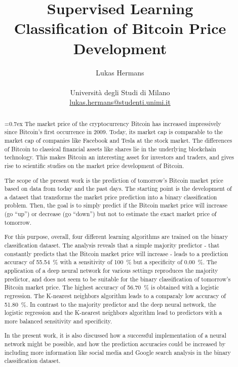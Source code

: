 \title{\large Supervised Learning \\ \LARGE
 Classification of Bitcoin Price Development}
\author{Lukas Hermans\\ \\
{Università degli Studi di Milano} \\
\href{mailto:lukas.hermans@studenti.unimi.it}
{lukas.hermans@studenti.unimi.it}}

\maketitle

\begin{abstract} 
\noindent
{}\font=0.7ex%
The market price of the cryptocurrency Bitcoin has increased impressively since Bitcoin's first occurrence in 2009. Today, its market cap is comparable to the market cap of companies like Facebook and Tesla at the stock market. The differences of Bitcoin to classical financial assets like shares lie in the underlying blockchain technology. This makes Bitcoin an interesting asset for investors and traders, and gives rise to scientific studies on the market price development of Bitcoin. 

\noindent
The scope of the present work is the prediction of tomorrow's Bitcoin market price based on data from today and the past days. The starting point is the development of a dataset that transforms the market price prediction into a binary classification problem. Then, the goal is to simply predict if the Bitcoin market price will increase (go \enquote{up}) or decrease (go \enquote{down}) but not to estimate the exact market price of tomorrow. 

\noindent
For this purpose, overall, four different learning algorithms are trained on the binary classification dataset. The analysis reveals that a simple majority predictor - that constantly predicts that the Bitcoin market price will increase - leads to a prediction accuracy of \SI{55.54}{\percent} with a sensitivity of \SI{100}{\percent} but a specificity of \SI{0.00}{\percent}. The application of a deep neural network for various settings reproduces the majority predictor, and does not seem to be suitable for the binary classification of tomorrow's Bitcoin market price. The highest accuracy of \SI{56.70}{\percent} is obtained with a logistic regression. The K-nearest neighbors algorithm leads to a comparaly low accuracy of \SI{51.80}{\percent}. In contrast to the majority predictor and the deep neural network, the logistic regression and the K-nearest neighbors algorithm lead to predictors with a more balanced sensitivity and specificity. 

\noindent
In the present work, it is also discussed how a successful implementation of a neural network might be possible, and how the prediction accuracies could be increased by including more information like social media and Google search analysis in the binary classification dataset.

\end{abstract}
